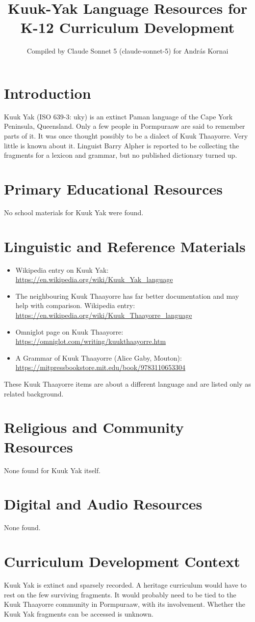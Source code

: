 \documentclass[12pt]{article}
\title{Kuuk-Yak Language Resources for K-12 Curriculum Development}
\author{Compiled by Claude Sonnet 5 (claude-sonnet-5) for Andr\'as Kornai}
\date{}
\begin{document}
\maketitle

\section{Introduction}
Kuuk Yak (ISO 639-3: uky) is an extinct Paman language of the Cape York Peninsula, Queensland. Only a few people in Pormpuraaw are said to remember parts of it. It was once thought possibly to be a dialect of Kuuk Thaayorre. Very little is known about it. Linguist Barry Alpher is reported to be collecting the fragments for a lexicon and grammar, but no published dictionary turned up.

\section{Primary Educational Resources}
No school materials for Kuuk Yak were found.

\section{Linguistic and Reference Materials}
\begin{itemize}
\item Wikipedia entry on Kuuk Yak: \url{https://en.wikipedia.org/wiki/Kuuk_Yak_language}
\item The neighbouring Kuuk Thaayorre has far better documentation and may help with comparison. Wikipedia entry: \url{https://en.wikipedia.org/wiki/Kuuk_Thaayorre_language}
\item Omniglot page on Kuuk Thaayorre: \url{https://omniglot.com/writing/kuukthaayorre.htm}
\item A Grammar of Kuuk Thaayorre (Alice Gaby, Mouton): \url{https://mitpressbookstore.mit.edu/book/9783110653304}
\end{itemize}
These Kuuk Thaayorre items are about a different language and are listed only as related background.

\section{Religious and Community Resources}
None found for Kuuk Yak itself.

\section{Digital and Audio Resources}
None found.

\section{Curriculum Development Context}
Kuuk Yak is extinct and sparsely recorded. A heritage curriculum would have to rest on the few surviving fragments. It would probably need to be tied to the Kuuk Thaayorre community in Pormpuraaw, with its involvement. Whether the Kuuk Yak fragments can be accessed is unknown.
\end{document}
